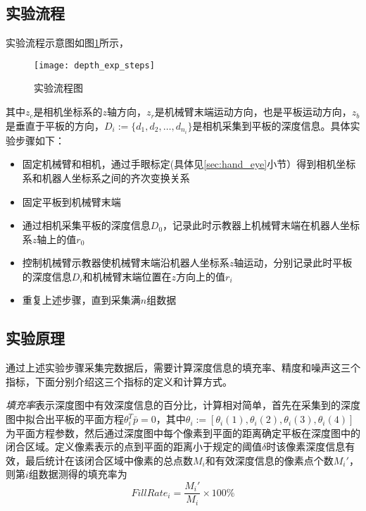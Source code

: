 \subsection{实验流程}
实验流程示意图如图\ref{fig:depth_exp_steps}所示，
\begin{figure}[ht]
  \centering
  \texttt{[image: depth\_exp\_steps]}
  \caption{实验流程图}
  \label{fig:depth_exp_steps}
\end{figure}
其中$z_c$是相机坐标系的$z$轴方向，$z_r$是机械臂末端运动方向，也是平板运动方向，$z_b$是垂直于平板的方向，$D_i:=\{d_1,d_2,…,d_{n_i}\}$是相机采集到平板的深度信息。具体实验步骤如下：
\begin{itemize}
\item 固定机械臂和相机，通过手眼标定(具体见\ref{sec:hand_eye}小节）得到相机坐标系和机器人坐标系之间的齐次变换关系
\item 固定平板到机械臂末端
\item 通过相机采集平板的深度信息$D_0$，记录此时示教器上机械臂末端在机器人坐标系$z$轴上的值$r_0$
\item 控制机械臂示教器使机械臂末端沿机器人坐标系$z$轴运动，分别记录此时平板的深度信息$D_i$和机械臂末端位置在$z$方向上的值$r_i$
\item 重复上述步骤，直到采集满$n$组数据
\end{itemize}

\subsection{实验原理}
通过上述实验步骤采集完数据后，需要计算深度信息的填充率、精度和噪声这三个指标，下面分别介绍这三个指标的定义和计算方式。

\emph{填充率}表示深度图中有效深度信息的百分比，计算相对简单，首先在采集到的深度图中拟合出平板的平面方程$\theta_i^T\bar{p}=0$，其中$\theta_i := [\theta_i(1), \theta_i(2), \theta_i(3), \theta_i(4)]$为平面方程参数，然后通过深度图中每个像素到平面的距离确定平板在深度图中的闭合区域。定义像素表示的点到平面的距离小于规定的阈值$\delta$时该像素深度信息有效，最后统计在该闭合区域中像素的总点数$M_i$和有效深度信息的像素点个数$M_i'$，则第$i$组数据测得的填充率为
\begin{equation}
  FillRate_i = \frac{M_i'}{M_i} \times 100\%
\end{equation}

